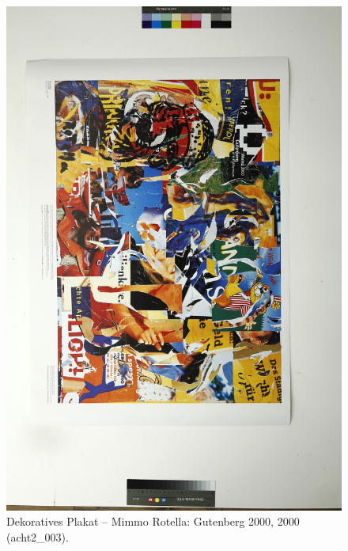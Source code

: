 \documentclass[a4paper,12pt,ngerman]{article}
\begin{document}
\newpage
\begin{landscape}
\begin{figure}[ht]
\includegraphics[height=0.85\linewidth, angle=90]{Abbildung_46_(acht2_003)}
\centering
\caption{Dekoratives Plakat -- Mimmo Rotella: Gutenberg 2000, 2000 (acht2\_003).}
\end{figure}
\end{landscape}
\end{document}

